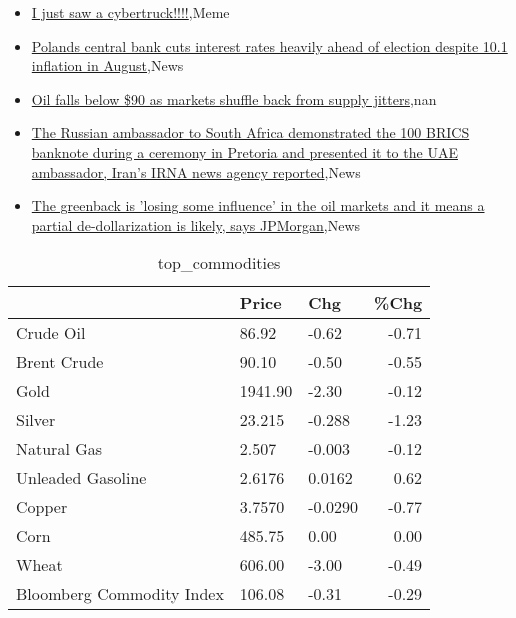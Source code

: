 \documentclass{article}%
\begin{document}
%
\begin{itemize}%
\item%
\href{https://reddit.com/r/wallstreetbets/comments/16cc98f/i\_just\_saw\_a\_cybertruck/}{I just saw a cybertruck!!!!},Meme%
\item%
\href{https://reddit.com/r/Economics/comments/16br6j5/polands\_central\_bank\_cuts\_interest\_rates\_heavily/}{Polands central bank cuts interest rates heavily ahead of election despite 10.1 inflation in August},News%
\item%
\href{https://reddit.com/r/Economics/comments/16bqyte/oil\_falls\_below\_90\_as\_markets\_shuffle\_back\_from/}{Oil falls below \$90 as markets shuffle back from supply jitters},nan%
\item%
\href{https://reddit.com/r/Economics/comments/16bpbnd/the\_russian\_ambassador\_to\_south\_africa/}{The Russian ambassador to South Africa demonstrated the 100 BRICS banknote during a ceremony in Pretoria and presented it to the UAE ambassador, Iran's IRNA news agency reported},News%
\item%
\href{https://reddit.com/r/Economics/comments/16bhneh/the\_greenback\_is\_losing\_some\_influence\_in\_the\_oil/}{The greenback is 'losing some influence' in the oil markets  and it means a partial de-dollarization is likely, says JPMorgan},News%
\end{itemize}%


\begin{table}[htbp]%
\caption{top\_commodities}%
\centering%
\begin{adjustbox}{width=1\textwidth}%
\begin{tabular}{lllr}
\toprule
                          &   Price &     Chg &  \%Chg \\
\midrule
               Crude Oil  &   86.92 &   -0.62 & -0.71 \\
             Brent Crude  &   90.10 &   -0.50 & -0.55 \\
                    Gold  & 1941.90 &   -2.30 & -0.12 \\
                  Silver  &  23.215 &  -0.288 & -1.23 \\
             Natural Gas  &   2.507 &  -0.003 & -0.12 \\
       Unleaded Gasoline  &  2.6176 &  0.0162 &  0.62 \\
                  Copper  &  3.7570 & -0.0290 & -0.77 \\
                    Corn  &  485.75 &    0.00 &  0.00 \\
                   Wheat  &  606.00 &   -3.00 & -0.49 \\
Bloomberg Commodity Index &  106.08 &   -0.31 & -0.29 \\
\bottomrule
\end{tabular}
%
\end{adjustbox}%
\end{table}
\end{document}

